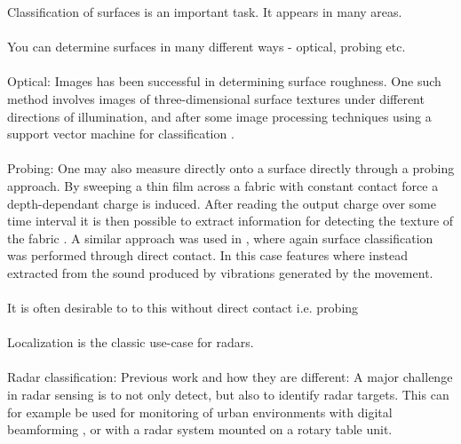 \documentclass[a4paper, 12pt]{article}
\begin{document}
Classification of surfaces is an important task. It appears in many areas.
\\ \\
You can determine surfaces in many different ways - optical, probing etc.
\\ \\
\noindent Optical: Images has been successful in determining surface roughness. One such method involves images of three-dimensional surface textures under different directions of illumination, and after some image processing techniques using a support vector machine for classification \citep{dong_duan_yang_2008}. 
\\ \\
\noindent Probing: One may also measure directly onto a surface directly through a probing approach. By sweeping a thin film across a fabric with constant contact force a depth-dependant charge is induced. After reading the output charge over some time interval it is then possible to extract information for detecting the texture of the fabric \citep{song_han_hu_li_2014}. A similar approach was used in \citep{strese_schuwerk_iepure_steinbach_2017}, where again surface classification was performed through direct contact. In this case features where instead extracted from the sound produced by vibrations generated by the movement. 
\\ \\
It is often desirable to to this without direct contact i.e. probing
\\ \\
Localization is the classic use-case for radars. 
\\ \\
Radar classification: Previous work and how they are different: A major challenge in radar sensing is to not only detect, but also to identify radar targets. This can for example be used for monitoring of urban environments with digital beamforming \citep{harter_kowalewski_sit_jalilvand_ziroff_zwick_2014}, or with a radar system mounted on a rotary table unit. 
\end{document}
